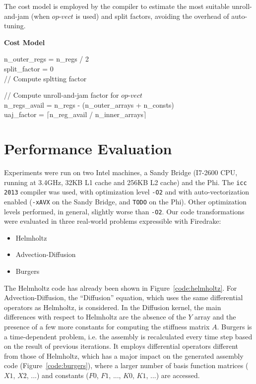 \documentclass[conference]{IEEEtran}
\begin{document}
\begin{algorithm}[t]
\caption{The cost model is employed by the compiler to estimate the most suitable unroll-and-jam (when $op$-$vect$ is used) and split factors, avoiding the overhead of auto-tuning.}
\label{algo:applyCostModel}
  \textbf{Cost Model}\\

n\_outer\_regs = n\_regs / 2 \\
split\_factor = 0 \\ 
// Compute spltting factor \\

// Compute unroll-and-jam factor for $op$-$vect$ \\
n\_regs\_avail = n\_regs - (n\_outer\_arrays + n\_consts)\\
uaj\_factor = $\lceil$n\_reg\_avail / n\_inner\_arrays$\rceil$ \\
\end{algorithm}


\section{Performance Evaluation}
\label{sec:perf-results}

Experiments were run on two Intel machines, a Sandy Bridge (I7-2600 CPU, running at 3.4GHz, 32KB L1 cache and 256KB L2 cache) and the Phi. The \texttt{icc 2013} compiler was used, with optimization level \texttt{-O2} and with auto-vectorization enabled (\texttt{-xAVX} on the Sandy Bridge, and \texttt{TODO} on the Phi). Other optimization levels performed, in general, slightly worse than \texttt{-O2}. Our code transformations were evaluated in three real-world problems expressible with Firedrake:
\begin{itemize}
\item Helmholtz
\item Advection-Diffusion
\item Burgers
\end{itemize}
The Helmholtz code has already been shown in Figure~\ref{code:helmholtz}. For Advection-Diffusion, the ``Diffusion'' equation, which uses the same differential operators as Helmholtz, is considered. In the Diffusion kernel, the main differences with respect to Helmholtz are the absence of the $Y$ array and the presence of a few more constants for computing the stiffness matrix $A$. Burgers is a time-dependent problem, i.e. the assembly is recalculated every time step based on the result of previous iterations. It employs differential operators different from those of Helmholtz, which has a major impact on the generated assembly code (Figure~\ref{code:burgers}), where a larger number of basis function matrices ($X1$, $X2$, ...) and constants ($F0$, $F1$, ..., $K0$, $K1$, ...) are accessed. 
\end{document}
